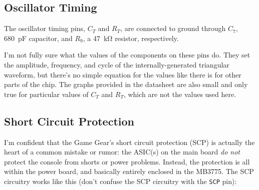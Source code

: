 \documentclass{article}
\newcommand{\chippin}{\texttt}
\newcommand{\model}{\textsf}
\begin{document}
\subsection{Oscillator Timing}
The oscillator timing pins, $C_T$ and $R_T$, are connected to ground
through $C_7$, \qty{680}{\pico\farad} capacitor, and $R_9$, a
\qty{47}{\kilo\ohm} resistor, respectively.

I'm not fully sure what the values of the components on these pins
do. They set the amplitude, frequency, and cycle of the
internally-generated triangular waveform, but there's no simple
equation for the values like there is for other parts of the chip. The
graphs provided in the datasheet are also small and only true for
particular values of $C_T$ and $R_T$, which are not the values used
here.

\subsection{Short Circuit Protection}
\label{sec:scp}
I'm confident that the Game Gear's short circuit protection (SCP) is
actually the heart of a common mistake or rumor: the ASIC(s) on the
main board \emph{do not} protect the console from shorts or power
problems. Instead, the protection is all within the power board, and
basically entirely enclosed in the \model{MB3775}. The SCP circuitry
works like this (don't confuse the SCP circuitry with the
\chippin{SCP} pin):
\end{document}
